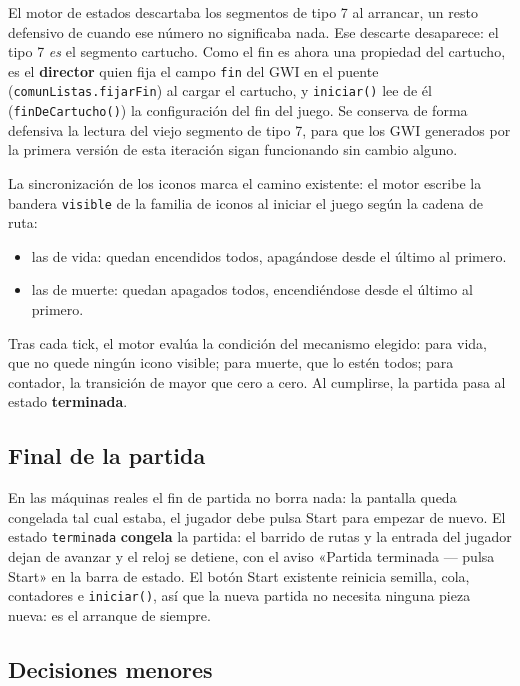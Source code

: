 El motor de estados descartaba los segmentos de tipo 7 al arrancar, un resto
defensivo de cuando ese número no significaba nada. Ese descarte desaparece:
el tipo 7 \emph{es} el segmento cartucho. Como el fin es ahora una propiedad
del cartucho, es el \textbf{director} quien fija el campo \texttt{fin} del GWI
en el puente (\texttt{comunListas.fijarFin}) al cargar el cartucho, y
\texttt{iniciar()} lee de él (\texttt{finDeCartucho()}) la configuración del
fin del juego. Se conserva de forma defensiva la lectura del viejo segmento de
tipo 7, para que los GWI generados por la primera versión de esta iteración
sigan funcionando sin cambio alguno.

La sincronización de los iconos marca el camino existente: el motor escribe la bandera \texttt{visible} de la familia de iconos al iniciar el  juego según la cadena de ruta:
\begin{itemize}
	\item las de vida: quedan encendidos todos, apagándose desde el último al primero.
	\item las de muerte: quedan apagados todos, encendiéndose desde el último al primero.
\end{itemize}

Tras cada tick, el motor evalúa la condición del mecanismo elegido: para
vida, que no quede ningún icono visible; para muerte, que lo estén todos; para
contador, la transición de mayor que cero a cero. Al cumplirse, la partida
pasa al estado \textbf{terminada}.

\subsection{Final de la partida}
\label{subsec:CongelarF3I11}

En las máquinas reales el fin de partida no borra nada: la pantalla queda congelada tal
cual estaba, el jugador debe pulsa Start para empezar de nuevo. El estado
\texttt{terminada} \textbf{congela} la partida: el barrido de rutas y la
entrada del jugador dejan de avanzar y el reloj se detiene, con el aviso
«Partida terminada — pulsa Start» en la barra de estado. El botón Start
existente reinicia semilla, cola, contadores e \texttt{iniciar()}, así que la
nueva partida no necesita ninguna pieza nueva: es el arranque de siempre.

\subsection{Decisiones menores}
\label{subsec:DecisionesF3I11}

